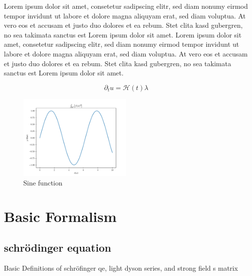 Lorem ipsum dolor sit amet, consetetur sadipscing elitr, sed diam nonumy eirmod tempor invidunt ut labore et dolore magna aliquyam erat, sed diam voluptua. At vero eos et accusam et justo duo dolores et ea rebum. Stet clita kasd gubergren, no sea takimata sanctus est Lorem ipsum dolor sit amet. Lorem ipsum dolor sit amet, consetetur sadipscing elitr, sed diam nonumy eirmod tempor invidunt ut labore et dolore magna aliquyam erat, sed diam voluptua. At vero eos et accusam et justo duo dolores et ea rebum. Stet clita kasd gubergren, no sea takimata sanctus est Lorem ipsum dolor sit amet.

\begin{equation}
    \partial_t u = \mathcal{H}(t)  \lambda 
\end{equation}

\begin{figure}[H]
    \centering
    \includegraphics[width=0.5\textwidth]{figures/plot.pdf}
    \caption{Sine function}
    \label{fig:sinus}
\end{figure}



\newpage
\section{Basic Formalism}
\subsection{schrödinger equation}

Basic Definitions of schröfinger qe, light dyson series, and strong field s matrix

